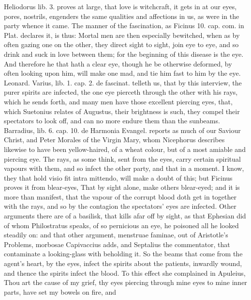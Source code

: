 {Heliodorus lib. 3. proves at large, that love is witchcraft, it
gets in at our eyes, pores, nostrils, engenders the same qualities and
affections in us, as were in the party whence it came. The manner of
the fascination, as Ficinus 10. cap. com. in Plat. declares it, is
thus: Mortal men are then especially bewitched, when as by often gazing
one on the other, they direct sight to sight, join eye to eye, and so
drink and suck in love between them; for the beginning of this disease
is the eye. And therefore he that hath a clear eye, though he be
otherwise deformed, by often looking upon him, will make one mad, and
tie him fast to him by the eye. Leonard. Varius, lib. 1. cap. 2. de
fascinat. telleth us, that by this interview, the purer spirits
are infected, the one eye pierceth through the other with his rays,
which he sends forth, and many men have those excellent piercing eyes,
that, which Suetonius relates of Augustus, their brightness is such,
they compel their spectators to look off, and can no more endure them
than the sunbeams. Barradius, lib. 6. cap. 10. de Harmonia
Evangel. reports as much of our Saviour Christ, and Peter Morales
of the Virgin Mary, whom Nicephorus describes likewise to have been
yellow-haired, of a wheat colour, but of a most amiable and piercing
eye. The rays, as some think, sent from the eyes, carry certain
spiritual vapours with them, and so infect the other party, and that in
a moment. I know, they that hold visio fit intra mittendo, will make a
doubt of this; but Ficinus proves it from blear-eyes,  That by
sight alone, make others blear-eyed; and it is more than manifest, that
the vapour of the corrupt blood doth get in together with the rays, and
so by the contagion the spectators' eyes are infected. Other arguments
there are of a basilisk, that kills afar off by sight, as that Ephesian
did of whom Philostratus speaks, of so pernicious an eye, he
poisoned all he looked steadily on: and that other argument, menstruae
faminae, out of Aristotle's Problems, morbosae Capivaccius adds, and
Septalius the commentator, that contaminate a looking-glass with
beholding it.  So the beams that come from the agent's heart, by
the eyes, infect the spirits about the patients, inwardly wound, and
thence the spirits infect the blood. To this effect she complained in
Apuleius, Thou art the cause of my grief, thy eyes piercing
through mine eyes to mine inner parts, have set my bowels on fire, and
}
